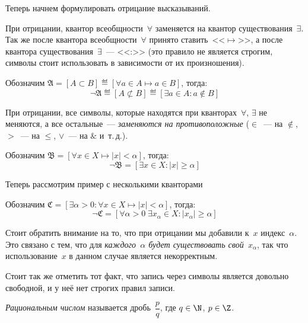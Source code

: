 Теперь начнем формулировать отрицание высказываний.

\begin{example}
При отрицании, квантор всеобщности~\(\forall\) заменяется на квантор существования~\(\exists\). Так
же после квантора всеобщности~\(\forall\) принято ставить~<<\(\mapsto\)>>, а после квантора
существования~\(\exists\)~--- <<:>> (это правило не является строгим, символы стоит использовать в
зависимости от их произношения).

Обозначим \(\mathfrak{A} = \left[A \subset B\right] \eqdef \left[\forall a \in A \mapsto a \in B
\right]\), тогда:
\[
    \neg \mathfrak{A} \eqdef \left[A \not\subset B\right] \eqdef \left[\exists a \in A: a \notin B
        \right]
\]
\end{example}

\begin{example}
При отрицании, все символы, которые находятся при кванторах~\(\forall\), \(\exists\) не меняются,
а все остальные~--- \textit{заменяются на противоположные} (\(\in\)~--- на \(\notin\), \(>\)~--- на
\(\leq\), \(\lor\)~--- на \(\&\) и~т.\,д.).

Обозначим \(\mathfrak{B} = \left[\forall x \in X \mapsto \lvert x \rvert < \alpha \right]\), тогда:
\[
    \neg \mathfrak{B} = \left[\exists x \in X: \lvert x \rvert \ge \alpha\right]
\]
\end{example}

\begin{example}
Теперь рассмотрим пример с несколькими кванторами

Обозначим \(\mathfrak{C} = \left[\exists \alpha > 0: \forall x \in X \mapsto \lvert x \rvert <
\alpha\right]\), тогда:
\[
    \neg \mathfrak{C} = \left[ \forall \alpha > 0 \; \exists x_\alpha \in X: \lvert x_\alpha \rvert
        \geq \alpha\right]
\]

Стоит обратить внимание на то, что при отрицании мы добавили к~\(x\) индекс~\(\alpha\). Это связано
с тем, что для \textit{каждого~\(\alpha\) будет существовать свой~\(x_{\alpha}\)}, так что
использование~\(x\) в данном случае является некорректным.
\end{example}

Стоит так же отметить тот факт, что запись через символы является довольно свободной, и у неё нет
строгих правил записи.



\begin{definition}
\textit{Рациональным числом} называется дробь~\(\dfrac{p}{q}\), где \(q \in \N\), \(p \in \Z\).
\end{definition}

